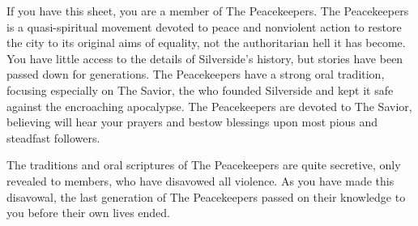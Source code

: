 \documentclass[blue]{Silversiders}
\begin{document}
\name{\bPeacekeepers{}}

If you have this sheet, you are a member of The Peacekeepers. The Peacekeepers is a quasi-spiritual movement devoted to peace and nonviolent action to restore the city to its original aims of equality, not the authoritarian hell it has become. You have little access to the details of Silverside's history, but stories have been passed down for generations. The Peacekeepers have a strong oral tradition, focusing especially on The Savior, the \cSavior{\human} who founded Silverside and kept it safe against the encroaching apocalypse. The Peacekeepers are devoted to The Savior, believing \cSavior{\they} will hear your prayers and bestow blessings upon \cSavior{\their} most pious and steadfast followers.

The traditions and oral scriptures of The Peacekeepers are quite secretive, only revealed to members, who have disavowed all violence. As you have made this disavowal, the last generation of The Peacekeepers passed on their knowledge to you before their own lives ended.
\end{document}
